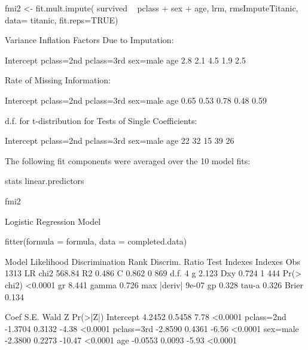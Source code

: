 \begin{Schunk}
\begin{Sinput}
 fmi2 <- fit.mult.impute( survived ~ pclass + sex + age, lrm, rmsImputeTitanic, data= titanic, fit.reps=TRUE)
\end{Sinput}
\begin{Soutput}
Variance Inflation Factors Due to Imputation:

 Intercept pclass=2nd pclass=3rd   sex=male        age 
       2.8        2.1        4.5        1.9        2.5 

Rate of Missing Information:

 Intercept pclass=2nd pclass=3rd   sex=male        age 
      0.65       0.53       0.78       0.48       0.59 

d.f. for t-distribution for Tests of Single Coefficients:

 Intercept pclass=2nd pclass=3rd   sex=male        age 
        22         32         15         39         26 

The following fit components were averaged over the 10 model fits:

  stats linear.predictors 
\end{Soutput}
\begin{Sinput}
 fmi2
\end{Sinput}
\begin{Soutput}
Logistic Regression Model

fitter(formula = formula, data = completed.data)

                      Model Likelihood     Discrimination    Rank Discrim.    
                         Ratio Test            Indexes          Indexes       
Obs          1313    LR chi2     568.84    R2       0.486    C       0.862    
 0            869    d.f.             4    g        2.123    Dxy     0.724    
 1            444    Pr(> chi2) <0.0001    gr       8.441    gamma   0.726    
max |deriv| 9e-07                          gp       0.328    tau-a   0.326    
                                           Brier    0.134                     

           Coef    S.E.   Wald Z Pr(>|Z|)
Intercept   4.2452 0.5458   7.78 <0.0001 
pclass=2nd -1.3704 0.3132  -4.38 <0.0001 
pclass=3rd -2.8590 0.4361  -6.56 <0.0001 
sex=male   -2.3800 0.2273 -10.47 <0.0001 
age        -0.0553 0.0093  -5.93 <0.0001 
\end{Soutput}
\end{Schunk}
